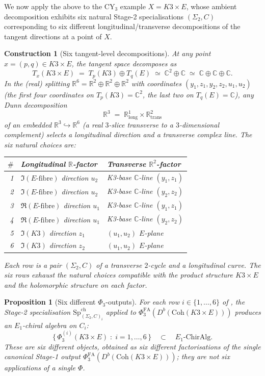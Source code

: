 \documentclass[11pt]{article}
\newtheorem{proposition}[theorem]{Proposition}
\newtheorem{construction}[theorem]{Construction}
\newcommand{\Eone}{E_{1}}
\newcommand{\R}{\mathbb{R}}
\newcommand{\C}{\mathbb{C}}
\newcommand{\PhiFA}{\Phi^{\mathrm{FA}}}
\newcommand{\SpCh}{\mathrm{Sp}^{\mathrm{ch}}}
\newcommand{\Coh}{\mathrm{Coh}}
\begin{document}
We now apply the above to the CY$_3$ example $X = K3 \times E$, whose
ambient decomposition exhibits six natural Stage-2 specialisations
$(\Sigma_{2}, C)$ corresponding to six different longitudinal/transverse
decompositions of the tangent directions at a point of $X$.

\begin{construction}[Six tangent-level decompositions]
\label{constr:six-decompositions}
At any point $x = (p, q) \in K3 \times E$, the tangent space
decomposes as
\[
  T_{x}(K3 \times E) \;=\; T_{p}(K3) \oplus T_{q}(E)
  \;\simeq\; \C^{2} \oplus \C
  \;\simeq\; \C \oplus \C \oplus \C.
\]
In the (real) splitting $\R^{6} = \R^{2} \oplus \R^{2} \oplus \R^{2}$
with coordinates $(y_{1}, z_{1}, y_{2}, z_{2}, u_{1}, u_{2})$ (the first
four coordinates on $T_{p}(K3) = \C^{2}$, the last two on $T_{q}(E) = \C$),
any Dunn decomposition
\[
  \R^{3} \;=\; \R^{1}_{\mathrm{long}} \times \R^{2}_{\mathrm{trans}}
\]
of an embedded $\R^{3} \hookrightarrow \R^{6}$ (a real $3$-slice
transverse to a $3$-dimensional complement) selects a longitudinal
direction and a transverse complex line. The six natural choices are:
\begin{center}
\renewcommand{\arraystretch}{1.3}
\begin{tabular}{rll}
\toprule
$\#$ & Longitudinal $\R$-factor & Transverse $\R^{2}$-factor \\
\midrule
1 & $\Im(E\text{-fibre})$ direction $u_{2}$
  & K3-base $\C$-line $(y_{1}, z_{1})$ \\
2 & $\Im(E\text{-fibre})$ direction $u_{2}$
  & K3-base $\C$-line $(y_{2}, z_{2})$ \\
3 & $\Re(E\text{-fibre})$ direction $u_{1}$
  & K3-base $\C$-line $(y_{1}, z_{1})$ \\
4 & $\Re(E\text{-fibre})$ direction $u_{1}$
  & K3-base $\C$-line $(y_{2}, z_{2})$ \\
5 & $\Im(K3)$ direction $z_{1}$
  & $(u_{1}, u_{2})$ $E$-plane \\
6 & $\Im(K3)$ direction $z_{2}$
  & $(u_{1}, u_{2})$ $E$-plane \\
\bottomrule
\end{tabular}
\end{center}
Each row is a pair $(\Sigma_{2}, C)$ of a transverse $2$-cycle and a
longitudinal curve. The six rows exhaust the natural choices compatible
with the product structure $K3 \times E$ and the holomorphic structure
on each factor.
\end{construction}

\begin{proposition}[Six different $\Phi_{3}$-outputs]
\label{prop:six-phi3-outputs}
For each row $i \in \{1, \ldots, 6\}$ of
, the Stage-2 specialisation
$\SpCh_{(\Sigma_{2}, C)_{i}}$ applied to
$\PhiFA_{3}(D^{b}(\Coh(K3 \times E)))$ produces an $\Eone$-chiral
algebra on $C_{i}$:
\[
  \bigl\{\,\Phi_{3}^{(i)}(K3 \times E)
  \;:\;i = 1, \ldots, 6\,\bigr\}
  \quad\subset\quad \Eone\text{-}\mathrm{ChirAlg}.
\]
These are six different objects, obtained as six different
factorisations of the single canonical Stage-1 output
$\PhiFA_{3}(D^{b}(\Coh(K3 \times E)))$; they are \emph{not} six
applications of a single $\Phi$.
\end{proposition}
\end{document}
